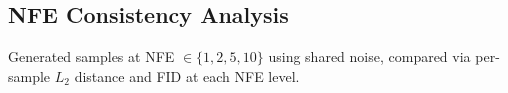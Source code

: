 \subsection{NFE Consistency Analysis}

Generated samples at NFE $\in \{1,2,5,10\}$ using shared noise, compared via
per-sample $L_2$ distance and FID at each NFE level.
